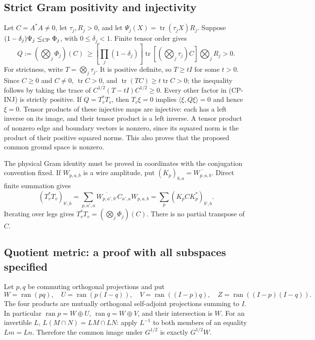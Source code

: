 \subsection{Strict Gram positivity and injectivity}
Let $C=A^*A\ne0$, let $\tau_j,R_j>0$, and let
$\Psi_j(X)=\operatorname{tr}(\tau_jX)R_j$. Suppose
$(1-\delta_j)\Psi_j\le_{\rm CP}\Phi_j$, with $0\le\delta_j<1$.
Finite tensor order gives
\[
 Q:=(\bigotimes_j\Phi_j)(C)\ \ge
 \left[\prod_j(1-\delta_j)\right]
 \operatorname{tr}[(\bigotimes_j\tau_j)C]\bigotimes_jR_j>0.
\tag{CP-INJ}
\]
For strictness, write $T=\bigotimes_j\tau_j$. It is positive definite,
so $T\ge tI$ for some $t>0$. Since $C\ge0$ and $C\ne0$,
$\operatorname{tr}C>0$, and
$\operatorname{tr}(TC)\ge t\operatorname{tr}C>0$; the inequality follows
by taking the trace of $C^{1/2}(T-tI)C^{1/2}\ge0$.
Every other factor in (CP-INJ) is strictly positive. If $Q=T_v^*T_v$,
then $T_v\xi=0$ implies $\langle\xi,Q\xi\rangle=0$ and hence $\xi=0$.
Tensor products of these injective maps are injective: each has a left
inverse on its image, and their tensor product is a left inverse.
A tensor product of nonzero edge and boundary vectors is nonzero, since
its squared norm is the product of their positive squared norms. This
also proves that the proposed common ground space is nonzero.

The physical Gram identity must be proved in coordinates with the
conjugation convention fixed. If $W_{p,a,b}$ is a wire amplitude, put
$(K_p)_{b,a}=\overline{W_{p,a,b}}$. Direct finite summation gives
\[
 (T_v^*T_v)_{b',b}
 =\sum_{p,a',a}\overline{W_{p,a',b'}}C_{a',a}W_{p,a,b}
 =\sum_p(K_pCK_p^*)_{b',b}.
\]
Iterating over legs gives $T_v^*T_v=(\bigotimes_j\Phi_j)(C)$.
There is no partial transpose of $C$.

\subsection{Quotient metric: a proof with all subspaces specified}
Let $p,q$ be commuting orthogonal projections and put
\[
 W=\operatorname{ran}(pq),\quad U=\operatorname{ran}(p(I-q)),\quad
 V=\operatorname{ran}((I-p)q),\quad Z=\operatorname{ran}((I-p)(I-q)).
\]
The four products are mutually orthogonal self-adjoint projections summing
to $I$. In particular $\operatorname{ran}p=W\oplus U$,
$\operatorname{ran}q=W\oplus V$, and their intersection is $W$.
For an invertible $L$, $L(M\cap N)=LM\cap LN$: apply $L^{-1}$ to both
members of an equality $Lm=Ln$. Therefore the common image under $G^{1/2}$
is exactly $G^{1/2}W$.


